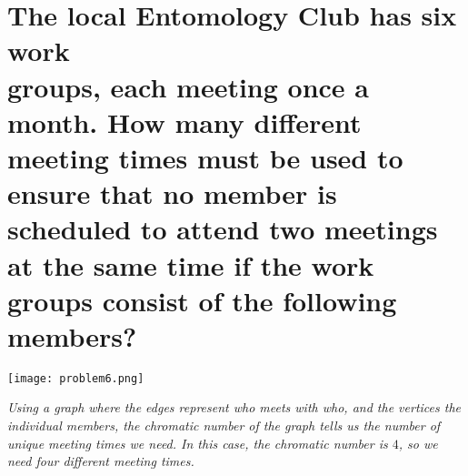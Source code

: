 \documentclass{article}
\begin{document}
\section{The local Entomology Club has six work \\ groups, each meeting once a month. How many different meeting times must be used to ensure that no member is scheduled to attend two meetings at the same time if the work groups consist of the following members?}
\begin{center}
    \texttt{[image: problem6.png]}
\end{center}
\begin{center}
\end{center}
\hspace{1cm}\textit{Using a graph where the edges represent who meets with who, and the vertices the individual members, the chromatic number of the graph tells us the number of unique meeting times we need. In this case, the chromatic number is $4$, so we need four different meeting times.}
\clearpage
\end{document}
